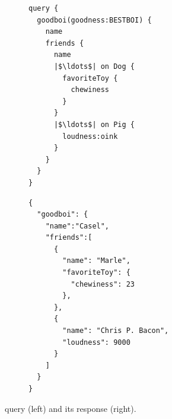 


\begin{figure}
\centering
\begin{subfigure}{.25\textwidth}
\begin{verbatim}
query {
  goodboi(goodness:BESTBOI) {
    name
    friends {
      name
      |$\ldots$| on Dog {
        favoriteToy {
          chewiness
        }
      }
      |$\ldots$| on Pig {
        loudness:oink
      }
    }
  }
}

\end{verbatim}
\label{fig:query_ex}
\end{subfigure}%
\begin{subfigure}{.25\textwidth}
\begin{verbatim}
{
  "goodboi": {
    "name":"Casel",
    "friends":[
      {
        "name": "Marle",
        "favoriteToy": {
          "chewiness": 23
        },
      },
      {
        "name": "Chris P. Bacon",
        "loudness": 9000
      }
    ]
  }
}
\end{verbatim}
\label{fig:response_ex}
\end{subfigure}
\caption{\gql query (left) and its response (right).}
\label{fig:qres_ex}
\end{figure}



